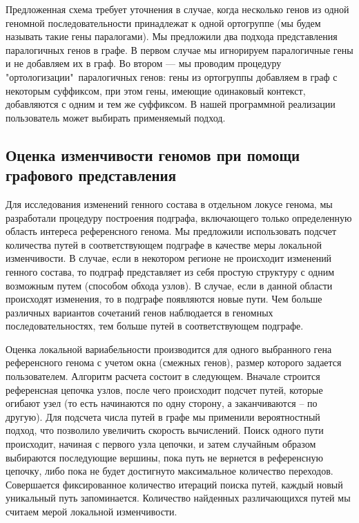 Предложенная схема требует уточнения в случае, когда несколько генов из одной геномной последовательности принадлежат к одной ортогруппе (мы будем называть такие гены паралогами). Мы предложили два подхода представления паралогичных генов в графе. В первом случае мы игнорируем паралогичные гены и не добавляем их в граф. Во втором --- мы проводим процедуру "ортологизации"\ паралогичных генов: гены из ортогруппы добавляем в граф с некоторым суффиксом, при этом гены, имеющие одинаковый контекст, добавляются с одним и тем же суффиксом. В нашей программной реализации пользователь может выбирать применяемый подход. 

\subsection*{Оценка изменчивости геномов при помощи графового представления}

Для исследования изменений генного состава в отдельном локусе генома, мы разработали процедуру построения подграфа, включающего только определенную область интереса референсного генома. Мы предложили использовать подсчет количества путей в соответствующем подграфе в качестве меры локальной изменчивости. В случае, если в некотором регионе не происходит изменений генного состава, то подграф представляет из себя простую структуру с одним возможным путем (способом обхода узлов). В случае, если в данной области происходят изменения, то в подграфе появляются новые пути. Чем больше различных вариантов сочетаний генов наблюдается в геномных последовательностях, тем больше путей в соответствующем подграфе. 

Оценка локальной вариабельности производится для одного выбранного гена референсного генома с учетом окна (смежных генов), размер которого задается пользователем. Алгоритм расчета состоит в следующем. Вначале строится референсная цепочка узлов, после чего происходит подсчет путей, которые огибают узел (то есть начинаются по одну сторону, а заканчиваются -- по другую). Для подсчета числа путей в графе мы применили вероятностный подход, что позволило увеличить скорость вычислений. Поиск одного пути происходит, начиная с первого узла цепочки, и затем  случайным образом выбираются последующие вершины, пока путь не вернется в референсную цепочку, либо пока не будет достигнуто максимальное количество переходов. Совершается фиксированное количество итераций поиска путей, каждый новый уникальный путь запоминается. Количество найденных различающихся путей мы считаем мерой локальной изменчивости.

